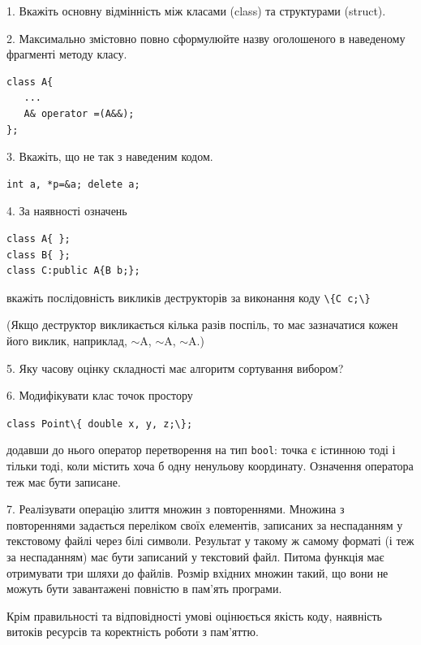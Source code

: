 \documentclass[12pt, ukrainian]{article}
\def\code#1{\Verb!#1!}
\begin{document}
{%
1. Вкажіть основну відмінність між класами (class) та структурами (struct).%
\par
\vspace{2mm}
2. Максимально змістовно повно сформулюйте назву оголошеного в наведеному фрагменті методу класу.
\vspace{-3mm}
\begin{verbatim}class A{
   ...
   A& operator =(A&&);
};\end{verbatim}
\vspace{-3mm}
\par
\vspace{2mm}
3. Вкажіть, що не так з наведеним кодом.
\vspace{-3mm}
\begin{verbatim}int a, *p=&a; delete a;\end{verbatim}
\vspace{-3mm}
\par
\vspace{2mm}
4. За наявності означень
\vspace{-3mm}
\begin{verbatim}
class A{ };
class B{ };
class C:public A{B b;};\end{verbatim}
\vspace{-3mm}
вкажіть послідовність викликів деструкторів за виконання коду \code{\{C c;\}} 

(Якщо деструктор викликається кілька разів поспіль, то має зазначатися кожен його виклик, наприклад, $\sim$A, $\sim$A, $\sim$A.)

\vspace{2mm}
5. Яку часову оцінку складності має алгоритм сортування вибором?
\par
\vspace{2mm}
6. Модифікувати клас точок простору 

\qquad\code{class Point\{ double x, y, z;\};}


додавши до нього оператор перетворення на тип \code{bool}: точка є істинною тоді і тільки тоді, коли містить хоча б одну ненульову координату. Означення оператора теж має бути записане.%
\par
\vspace{2mm}
7. 
Реалізувати операцію злиття множин з повтореннями. Множина з повтореннями задається переліком своїх елементів, записаних за неспаданням у текстовому файлі через білі символи. Результат у такому ж самому форматі (і теж за неспаданням) має бути записаний у текстовий файл. Питома функція має отримувати три шляхи до файлів. Розмір вхідних множин такий, що вони не можуть бути завантажені повністю в пам’ять програми.

Крім правильності та відповідності умові оцінюється якість коду, наявність витоків ресурсів та коректність роботи з пам'яттю. 

}
\end{document}
